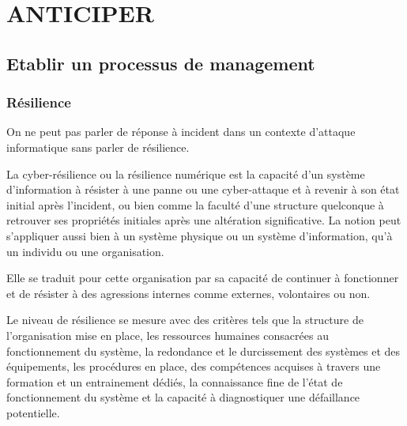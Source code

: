 %
%


\section{ANTICIPER}

\subsection{Etablir un processus de management} 



\subsubsection{Résilience}
 
 On ne peut pas parler de réponse à incident dans un contexte d'attaque informatique sans parler de résilience.
 
La cyber-résilience ou la résilience numérique est la capacité d’un système d’information à résister à une panne ou une cyber-attaque et à revenir à son état initial après l’incident, ou bien comme la faculté d’une structure quelconque à retrouver ses propriétés initiales après une altération significative. La notion peut s’appliquer aussi bien à un système physique ou un système d'information, qu’à un individu ou une organisation. 

Elle se traduit pour cette organisation par sa capacité de continuer à fonctionner et de résister à des agressions internes comme externes, volontaires ou non.

 Le niveau de résilience se mesure  avec des critères tels que la structure de l’organisation mise en place, les ressources humaines consacrées au fonctionnement du système, la redondance et le durcissement des systèmes et des équipements, les procédures en place, des compétences acquises à travers une formation et un entrainement dédiés, la connaissance fine de l’état de fonctionnement du système et la capacité à diagnostiquer une défaillance potentielle.
 
